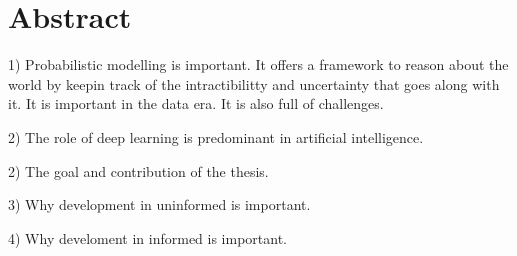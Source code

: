 
\chapter*{Abstract}
1) Probabilistic modelling is important. It offers a framework to reason about the world by keepin track of the intractibilitty and uncertainty that  goes along with it. It is important in the data era. It is also full of challenges.

2) The role of deep learning is predominant in artificial intelligence.

2) The goal and contribution of the thesis.

3) Why development in uninformed is important.

4) Why develoment in informed is important.

